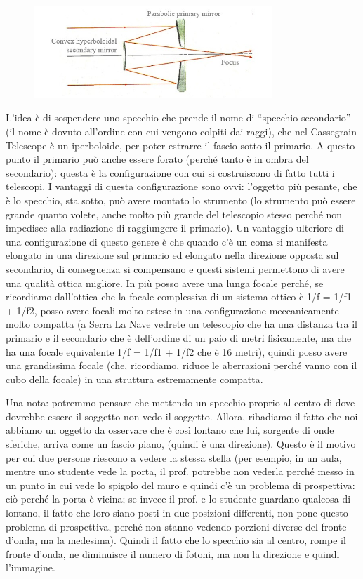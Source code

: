 \documentclass[a4paper,11pt]{article}
\begin{document}
\begin{figure}[h!!]
        \centering
        \includegraphics[width=9cm]{3.jpg}
        \label{}
    \end{figure}

L’idea è di sospendere uno specchio che prende il nome di “specchio secondario” (il nome è dovuto all’ordine con cui vengono colpiti dai raggi), che nel Cassegrain Telescope è un iperboloide, per poter estrarre il fascio sotto il primario. A questo punto il primario può anche essere forato (perché tanto è in ombra del secondario): questa è la configurazione con cui si costruiscono di fatto tutti i telescopi. I vantaggi di questa configurazione sono ovvi: l’oggetto più pesante, che è lo specchio, sta sotto, può avere montato lo strumento (lo strumento può essere grande quanto volete, anche molto più grande del telescopio stesso perché non impedisce alla radiazione di raggiungere il primario). Un vantaggio ulteriore di una configurazione di questo genere è che quando c’è un coma si manifesta elongato in una direzione sul primario ed elongato nella direzione opposta sul secondario, di conseguenza si compensano e questi sistemi permettono di avere una qualità ottica migliore. In più posso avere una lunga focale perché, se ricordiamo dall’ottica che la focale complessiva di un sistema ottico è 1/f = 1/f1 + 1/f2, posso avere focali molto estese in una configurazione meccanicamente molto compatta (a Serra La Nave vedrete un telescopio che ha una distanza tra il primario e il secondario che è dell’ordine di un paio di metri fisicamente, ma che ha una focale equivalente 1/f = 1/f1 + 1/f2 che è 16 metri), quindi posso avere una grandissima focale (che, ricordiamo, riduce le aberrazioni perché vanno con il cubo della focale) in una struttura estremamente compatta.

Una nota: potremmo pensare che mettendo un specchio proprio al centro di dove dovrebbe essere il soggetto non vedo il soggetto. Allora, ribadiamo il fatto che noi abbiamo un oggetto da osservare che è così lontano che lui, sorgente di onde sferiche, arriva come un fascio piano, (quindi è una direzione). Questo è il motivo per cui due persone riescono a vedere la stessa stella (per esempio, in un aula, mentre uno studente vede la porta, il prof. potrebbe non vederla perché messo in un punto in cui vede lo spigolo del muro e quindi c’è un problema di prospettiva: ciò perché la porta è vicina; se invece il prof. e lo studente guardano qualcosa di lontano, il fatto che loro siano posti in due posizioni differenti, non pone questo problema di prospettiva, perché non stanno vedendo porzioni diverse del fronte d’onda, ma la medesima). Quindi il fatto che lo specchio sia al centro, rompe il fronte d’onda, ne diminuisce il numero di fotoni, ma non la direzione e quindi l’immagine.
\end{document}
